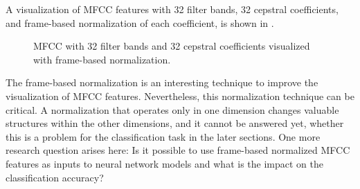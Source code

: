 A visualization of MFCC features with 32 filter bands, 32 cepstral coefficients, and frame-based normalization of each coefficient, is shown in .
\begin{figure}[!ht]
  \centering
  \caption{MFCC with 32 filter bands and 32 cepstral coefficients visualized with frame-based normalization.}
  \label{fig:signal_mfcc_showcase_mfcc32}
\end{figure}
\FloatBarrier
\noindent
The frame-based normalization is an interesting technique to improve the visualization of MFCC features.
Nevertheless, this normalization technique can be critical. 
A normalization that operates only in one dimension changes valuable structures within the other dimensions, and it cannot be answered yet, whether this is a problem for the classification task in the later sections.
One more research question arises here: Is it possible to use frame-based normalized MFCC features as inputs to neural network models and what is the impact on the classification accuracy?


